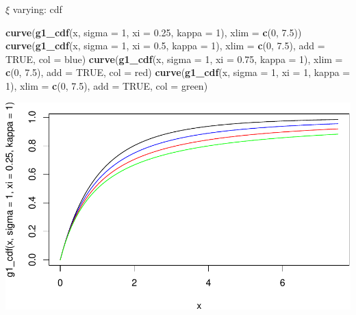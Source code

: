 \documentclass[
]{article}
\newenvironment{Shaded}{\begin{snugshade}}{\end{snugshade}}
\newcommand{\AttributeTok}[1]{\textcolor[rgb]{0.13,0.29,0.53}{#1}}
\newcommand{\ConstantTok}[1]{\textcolor[rgb]{0.56,0.35,0.01}{#1}}
\newcommand{\DecValTok}[1]{\textcolor[rgb]{0.00,0.00,0.81}{#1}}
\newcommand{\FloatTok}[1]{\textcolor[rgb]{0.00,0.00,0.81}{#1}}
\newcommand{\FunctionTok}[1]{\textcolor[rgb]{0.13,0.29,0.53}{\textbf{#1}}}
\newcommand{\NormalTok}[1]{#1}
\newcommand{\StringTok}[1]{\textcolor[rgb]{0.31,0.60,0.02}{#1}}
\begin{document}
\(\xi\) varying: cdf

\begin{Shaded}
\begin{Highlighting}[]
\FunctionTok{curve}\NormalTok{(}\FunctionTok{g1\_cdf}\NormalTok{(x, }\AttributeTok{sigma =} \DecValTok{1}\NormalTok{, }\AttributeTok{xi =} \FloatTok{0.25}\NormalTok{, }\AttributeTok{kappa =} \DecValTok{1}\NormalTok{), }\AttributeTok{xlim =} \FunctionTok{c}\NormalTok{(}\DecValTok{0}\NormalTok{, }\FloatTok{7.5}\NormalTok{))}
\FunctionTok{curve}\NormalTok{(}\FunctionTok{g1\_cdf}\NormalTok{(x, }\AttributeTok{sigma =} \DecValTok{1}\NormalTok{, }\AttributeTok{xi =} \FloatTok{0.5}\NormalTok{, }\AttributeTok{kappa =} \DecValTok{1}\NormalTok{), }\AttributeTok{xlim =} \FunctionTok{c}\NormalTok{(}\DecValTok{0}\NormalTok{, }\FloatTok{7.5}\NormalTok{), }\AttributeTok{add =} \ConstantTok{TRUE}\NormalTok{, }\AttributeTok{col =} \StringTok{\textquotesingle{}blue\textquotesingle{}}\NormalTok{)}
\FunctionTok{curve}\NormalTok{(}\FunctionTok{g1\_cdf}\NormalTok{(x, }\AttributeTok{sigma =} \DecValTok{1}\NormalTok{, }\AttributeTok{xi =} \FloatTok{0.75}\NormalTok{, }\AttributeTok{kappa =} \DecValTok{1}\NormalTok{), }\AttributeTok{xlim =} \FunctionTok{c}\NormalTok{(}\DecValTok{0}\NormalTok{, }\FloatTok{7.5}\NormalTok{), }\AttributeTok{add =} \ConstantTok{TRUE}\NormalTok{, }\AttributeTok{col =} \StringTok{\textquotesingle{}red\textquotesingle{}}\NormalTok{)}
\FunctionTok{curve}\NormalTok{(}\FunctionTok{g1\_cdf}\NormalTok{(x, }\AttributeTok{sigma =} \DecValTok{1}\NormalTok{, }\AttributeTok{xi =} \DecValTok{1}\NormalTok{, }\AttributeTok{kappa =} \DecValTok{1}\NormalTok{), }\AttributeTok{xlim =} \FunctionTok{c}\NormalTok{(}\DecValTok{0}\NormalTok{, }\FloatTok{7.5}\NormalTok{), }\AttributeTok{add =} \ConstantTok{TRUE}\NormalTok{, }\AttributeTok{col =} \StringTok{\textquotesingle{}green\textquotesingle{}}\NormalTok{)}
\end{Highlighting}
\end{Shaded}

\begin{center}\includegraphics[width=0.8\linewidth]{g1_varying_params_files/figure-latex/unnamed-chunk-7-1} \end{center}
\end{document}
